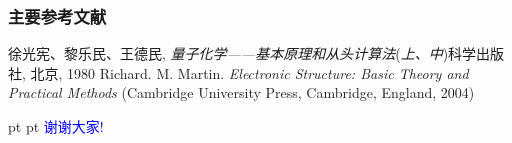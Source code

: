 \documentclass[cjk,slidestop,handout,compress,mathserif,blue]{beamer}	%
\begin{document}
\frame
{
\begin{thebibliography}{99}
\frametitle{主要参考文献}
{\small
	徐光宪、黎乐民、王德民, {\textit{量子化学——基本原理和从头计算法}}\;\textrm{({\textit{上、中}})}\:科学出版社, 北京, 1980
	\textrm{Richard. M. Martin. \textit{Electronic Structure: Basic Theory and Practical Methods} (Cambridge University Press, Cambridge, England, 2004)}
}
\nocite*{}
\end{thebibliography}
}

\logo{}
\frame
{
 pt
 pt
\hskip 60pt \textcolor{blue}{\Huge 谢谢大家\:!}
}


\clearpage
\end{document}
